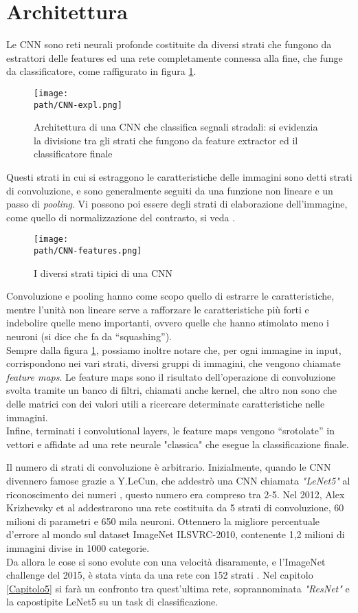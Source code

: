 \section{Architettura}
Le CNN sono reti neurali profonde costituite da diversi strati che fungono da estrattori delle features ed una rete completamente connessa alla fine, che funge da classificatore, come raffigurato in figura \ref{fig:cnn1}. \\
\begin{figure}[h!]
 \centering
 \texttt{[image: \\path/CNN-expl.png]} 
 \caption{Architettura di una CNN che classifica segnali stradali: si evidenzia la divisione tra gli strati che fungono da feature extractor ed il classificatore finale}
 \label{fig:cnn1}
\end{figure}
Questi strati in cui si estraggono le caratteristiche delle immagini sono detti strati di convoluzione, e sono generalmente seguiti da una funzione non lineare e un passo di \emph{pooling}. Vi possono poi essere degli strati di elaborazione dell'immagine, come quello di normalizzazione del contrasto, si veda .
\begin{figure}[h!]
 \centering
 \texttt{[image: \\path/CNN-features.png]} 
 \caption{I diversi strati tipici di una CNN}
 \label{fig:cnn2}
\end{figure}
Convoluzione e pooling hanno come scopo quello di estrarre le caratteristiche, mentre l’unità non lineare serve a rafforzare le caratteristiche più forti e indebolire quelle meno importanti, ovvero quelle che hanno stimolato meno i neuroni (si dice che fa da “squashing”). \\
Sempre dalla figura \ref{fig:cnn1}, possiamo inoltre notare che, per ogni immagine in input, corrispondono nei vari strati, diversi gruppi di immagini, che vengono chiamate \emph{feature maps}. Le feature maps sono il risultato dell'operazione di convoluzione svolta tramite un banco di filtri, chiamati anche kernel, che altro non sono che delle matrici con dei valori utili a ricercare determinate caratteristiche nelle immagini.\\
Infine, terminati i convolutional layers, le feature maps vengono “srotolate” in vettori e affidate ad una rete neurale "classica" che esegue la classificazione finale. 

Il numero di strati di convoluzione è arbitrario. Inizialmente, quando le CNN divennero famose grazie a Y.LeCun, che addestrò una CNN chiamata \emph{"LeNet5"} al riconoscimento dei numeri \parencite{lenet}, questo numero era compreso tra 2-5. Nel 2012, Alex Krizhevsky et al \parencite{imagenet2012} addestrarono una rete costituita da 5 strati di convoluzione, 60 milioni di parametri e 650 mila neuroni. Ottennero la migliore percentuale d'errore al mondo sul dataset ImageNet ILSVRC-2010, contenente 1,2 milioni di immagini divise in 1000 categorie. \\
Da allora le cose si sono evolute con una velocità disaramente, e l'ImageNet challenge del 2015, è stata vinta da una rete con 152 strati \parencite{resnet}. Nel capitolo \ref{Capitolo5} si farà un confronto tra quest'ultima rete, soprannominata \emph{"ResNet"} e la capostipite LeNet5 su un task di classificazione.   
